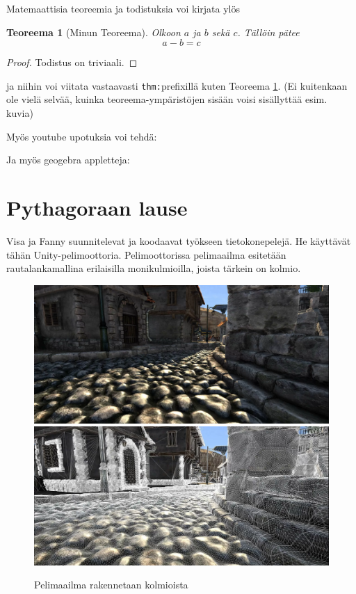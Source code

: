 \documentclass[
]{book}
\newtheorem{theorem}{Teoreema}[chapter]
\theoremstyle{definition}
\theoremstyle{definition}
\theoremstyle{definition}
\theoremstyle{definition}
\theoremstyle{remark}
\begin{document}
Matemaattisia teoreemia ja todistuksia voi kirjata ylös

\begin{theorem}[Minun Teoreema]
\protect\hypertarget{thm:my-theorem}{}\label{thm:my-theorem}Olkoon \(a\) ja \(b\) sekä \(c\). Tällöin pätee
\begin{equation*}
  a-b=c
\end{equation*}
\end{theorem}

\begin{proof}
Todistus on triviaali.
\end{proof}

ja niihin voi viitata vastaavasti \texttt{thm:}prefixillä kuten Teoreema \ref{thm:my-theorem}. (Ei kuitenkaan ole vielä selvää, kuinka teoreema-ympäristöjen sisään voisi sisällyttää esim. kuvia)

Myös youtube upotuksia voi tehdä:

Ja myös geogebra appletteja:

\hypertarget{pythagoraan-lause}{%
\chapter{Pythagoraan lause}\label{pythagoraan-lause}}

Visa ja Fanny suunnitelevat ja koodaavat työkseen tietokonepelejä. He käyttävät tähän Unity-pelimoottoria. Pelimoottorissa pelimaailma esitetään rautalankamallina erilaisilla monikulmioilla, joista tärkein on kolmio.

\begin{figure}

{\centering \includegraphics[width=0.8\linewidth,height=0.4\textheight]{img/renderoity} \includegraphics[width=0.8\linewidth,height=0.4\textheight]{img/rautalanka} 

}

\caption{Pelimaailma rakennetaan kolmioista}\label{fig:unnamed-chunk-7}
\end{figure}
\end{document}
